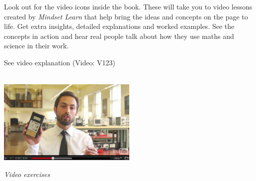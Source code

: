 {\Large

Look out for the video icons inside the book. These will take you to video lessons created by \textit{Mindset
Learn} that help bring the ideas and concepts on the page to life. Get extra insights, detailed
explanations and worked examples. See the concepts in action and hear real people talk about how they
use maths and science in their work. \par

\begin{center}
\caption{See video explanation  (Video: V123)}\\
\includegraphics[width=0.5\textwidth]{title_images/veritasiumvideo.png}
\end{center}\par

}
\vspace{0.5cm}
{\normalfont\sffamily\fontsize{22}\normalfont\itshape Video exercises} \par

